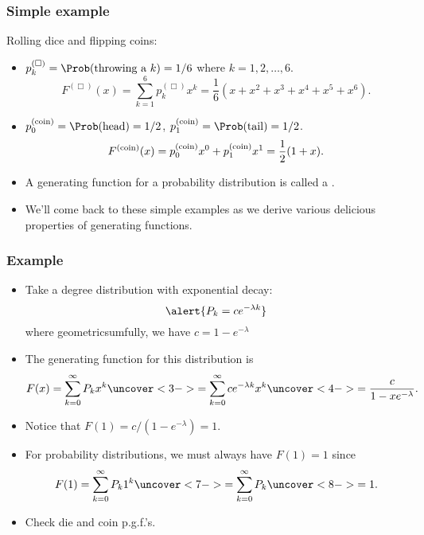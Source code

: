 \begin{frame}[label=]
  \frametitle{Simple example}
  
  \begin{block}{Rolling dice and flipping coins:}
    \begin{itemize}
    \item<1-> 
      $p_k^{(\Box)} = \Prob(\mbox{throwing a} \ k) = 1/6$ where $k = 1, 2, \ldots, 6$.
      $$
      F^{(\Box)}(x) 
      = 
      \sum_{k=1}^{6} p_k^{(\Box)} x^k 
      = 
      \frac{1}{6} (x + x^2 + x^3 + x^4 + x^5 + x^6).
      $$
    \item<2-> 
      $p_0^{\textnormal{(coin)}} = \Prob({\textnormal{head}}) = 1/2$, 
      $p_1^{\textnormal{(coin)}} = \Prob({\textnormal{tail}}) = 1/2$.
      $$
      F^{\textnormal{(coin)}}(x) 
      = 
      p_0^{\textnormal{(coin)}} x^0 + p_1^{\textnormal{(coin)}} x^1
      = 
      \frac{1}{2} (1 + x).
      $$
     \item<3-> 
     A generating function for a probability distribution is
      called a .
    \item<4-> 
      We'll come back to these simple examples
      as we derive various delicious properties 
      of generating functions.
    \end{itemize}
  \end{block}

\end{frame}

\begin{frame}[label=]
  \frametitle{Example}

    \begin{itemize}
    \item<1->
      Take a degree distribution with exponential decay:
      $$ \alert{P_k = c e^{-\lambda k}} $$
      where geometricsumfully, we have $c = 1 - e^{-\lambda}$
    \item<2->
      The generating function for this distribution is
      $$ 
      F(x)
      =
      \sum_{k=0}^\infty
      P_k x^k
      \uncover<3->{
      =
      \sum_{k=0}^\infty
      c e^{-\lambda k} x^k
      }
      \uncover<4->{
      =
      \frac{c}{1-xe^{-\lambda}}.
      }
      $$
    \item<5->
      Notice that $F(1) = c/(1-e^{-\lambda}) = 1$.
    \item<6->
      For probability distributions, we must
      always have \alert{$F(1)=1$} since
      $$
      F(1) 
      = 
      \sum_{k=0}^\infty P_k 1^k 
      \uncover<7->{
        =
        \sum_{k=0}^\infty P_k
      }
      \uncover<8->{
        =
        1.
      }
      $$
    \item<8->
      Check die and coin p.g.f.'s.
    \end{itemize}
  
\end{frame}

